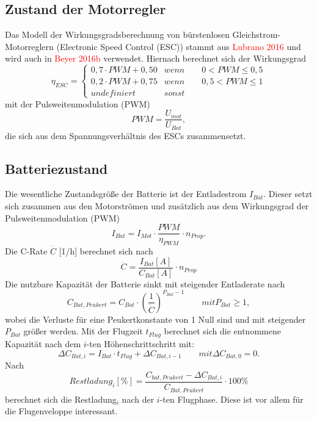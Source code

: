 \subsection{Zustand der Motorregler}
Das Modell der Wirkungsgradsberechnung von bürstenlosen Gleichstrom-Motorreglern (Electronic Speed Control (ESC)) stammt aus \textcolor{red}{Lubrano 2016} und wird auch in \textcolor{red}{Beyer 2016b} verwendet. Hiernach berechnet sich der Wirkungsgrad 
\begin{equation}
\eta_{ESC} = \begin{cases} 
0,7\cdot PWM + 0,50 & wenn \qquad 0 < PWM \leq 0,5 \\ 
0,2\cdot PWM + 0,75 & wenn \qquad 0,5 < PWM \leq 1 \\ 
undefiniert & sonst 
\end{cases}
\end{equation} 
mit der Pulsweitenmodulation (PWM) 
\begin{equation}
	PWM = \frac{U_{mot}}{U_{Bat}},
\end{equation}
die sich aus dem Spannungsverhältnis des ESCs zusammensetzt.


\subsection{Batteriezustand}
Die wesentliche Zustandsgröße der Batterie ist der Entladestrom \ensuremath{I_{Bat}}. Dieser setzt sich zusammen aus den Motorströmen und zusätzlich aus dem Wirkungsgrad der Pulsweitenmodulation (PWM)
\begin{equation}
	I_{Bat} = I_{Mot}\cdot \frac{PWM}{\eta_{PWM}}\cdot n_{Prop}.  \label{eq:batteriestrom}
\end{equation}
Die C-Rate \ensuremath{\dot{C}} [1/h] berechnet sich nach 
\begin{equation}
	\dot{C} = \frac{I_{Bat}[A]}{C_{Bat}[A]}\cdot n_{Prop}
\end{equation}
Die nutzbare Kapazität der Batterie sinkt mit steigender Entladerate nach
\begin{equation}
	C_{Bat,Peukert} = C_{Bat}\cdot (\frac{1}{\dot{C}})^{P_{Bat}-1} 
	\qquad mit P_{Bat} \geq 1,
\end{equation}
wobei die Verluste für eine Peukertkonstante von 1 Null sind und mit steigender \ensuremath{P_{Bat}} größer werden.
Mit der Flugzeit \ensuremath{t_{Flug}} berechnet sich die entnommene Kapazität nach dem \ensuremath{i}-ten Höhenschrittschritt mit: 
\begin{equation}
	\Delta C_{Bat,i} = I_{Bat}\cdot t_{Flug} + \Delta C_{Bat,i-1} 
	\qquad mit \Delta C_{Bat,0} = 0.
\end{equation}
Nach
\begin{equation}
	Restladung_i[\%] = \frac{C_{bat,Peukert}-\Delta C_{Bat,i}}{C_{Bat,Peukert}}\cdot 100\%
\end{equation}
berechnet sich die Restladung$_{i}$ nach der \ensuremath{i}-ten Flugphase. Diese ist vor allem für die Flugenveloppe interessant.\\

